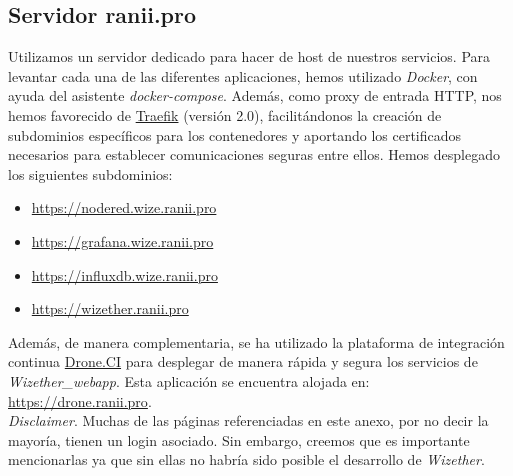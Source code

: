 \documentclass[12pt]{article}
\begin{document}
\pagebreak

\subsection{Servidor ranii.pro}
\noindent Utilizamos un servidor dedicado para hacer de host de nuestros servicios. Para levantar cada una de las diferentes aplicaciones, hemos utilizado \textit{Docker}, con ayuda del asistente \textit{docker-compose}. Además, como proxy de entrada HTTP, nos hemos favorecido de \href{https://traefik.io/}{Traefik} (versión 2.0), facilitándonos la creación de subdominios específicos para los contenedores y aportando los certificados necesarios para establecer comunicaciones seguras entre ellos. Hemos desplegado los siguientes subdominios:
\begin{itemize}
	\item \href{https://nodered.wize.ranii.pro}{https://nodered.wize.ranii.pro} 
	
	\item \href{https://grafana.wize.ranii.pro}{https://grafana.wize.ranii.pro} 
	
	\item \href{https://influxdb.wize.ranii.pro}{https://influxdb.wize.ranii.pro} 
	
	\item \href{https://wizether.ranii.pro}{https://wizether.ranii.pro} 
	
\end{itemize}

\noindent Además, de manera complementaria, se ha utilizado la plataforma de integración continua \href{https://www.drone.io/}{Drone.CI} para desplegar de manera rápida y segura los servicios de \textit{Wizether\_webapp}. Esta aplicación se encuentra alojada en: \href{https://drone.ranii.pro}{https://drone.ranii.pro}. \\

\noindent \textit{Disclaimer}. Muchas de las páginas referenciadas en este anexo, por no decir la mayoría,  tienen un login asociado. Sin embargo, creemos que es importante mencionarlas ya que sin ellas no habría sido posible el desarrollo de \textit{Wizether}.
\end{document}
